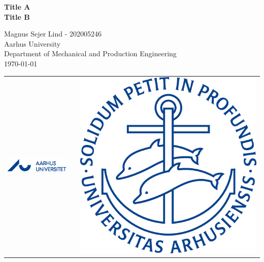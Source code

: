 \begin{titlepage}
\begin{center}
\vspace*{30 mm}

\LARGE
\textbf{Title A} \\
\textbf{Title B} \\        
            
\vspace{5 mm}

\large
Magnus Sejer Lind - 202005246 \\
Aarhus University \\
Department of Mechanical and Production Engineering \\
\today
            
        
            
        
            
        


            
\vspace{50 mm}
\begin{table}[H]
\centering
\begin{tabular}{cll}
\includegraphics[width = 80 mm]{Images/AU/aulogo_dk_var2_blaa.eps} & \hspace{15 mm} & \includegraphics[width = 30 mm]{Images/AU/ausegl_blaa.eps}
\end{tabular}
\end{table}


            
    \end{center}
\end{titlepage}